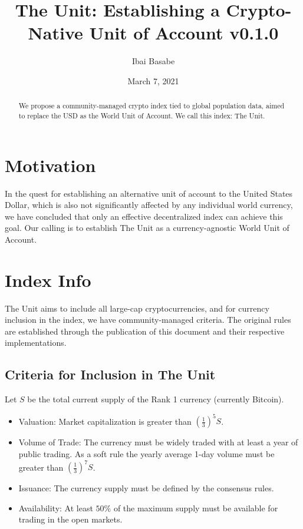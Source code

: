\documentclass[12pt]{article}
\title{The Unit: Establishing a Crypto-Native Unit of Account v0.1.0}
\author{Ibai Basabe}
\begin{document}
\date{March 7, 2021}

\pagecolor{yellow!15!}

\maketitle


\begin{abstract}
We propose a community-managed crypto index tied to global population data, aimed to replace the USD as the World Unit of Account. We call this index: The Unit. 
\end{abstract}


\tableofcontents
\newpage

\section{Motivation}

In the quest for establishing an alternative unit of account to the United States Dollar, which is also not significantly affected by any individual world currency, we have concluded that only an effective decentralized index can achieve this goal. Our calling is to establish The Unit as a currency-agnostic World Unit of Account. 

\section{Index Info}

The Unit aims to include all large-cap cryptocurrencies, and for currency inclusion in the index, we have community-managed criteria. The original rules are established through the publication of this document and their respective implementations.

\subsection{Criteria for Inclusion in The Unit}

Let $S$ be the total current supply of the Rank 1 currency (currently Bitcoin).

\begin{itemize}

\item Valuation: Market capitalization is greater than $\left(\frac{1}{3}\right)^5 S$.
\item Volume of Trade: The currency must be widely traded with at least a year of public trading. As a soft rule the yearly average 1-day volume must be greater than $\left(\frac{1}{3}\right)^7 S$.
\item Issuance: The currency supply must be defined by the consensus rules.
\item Availability: At least $50\%$ of the maximum supply must be available for trading in the open markets.

\end{itemize}
\end{document}
